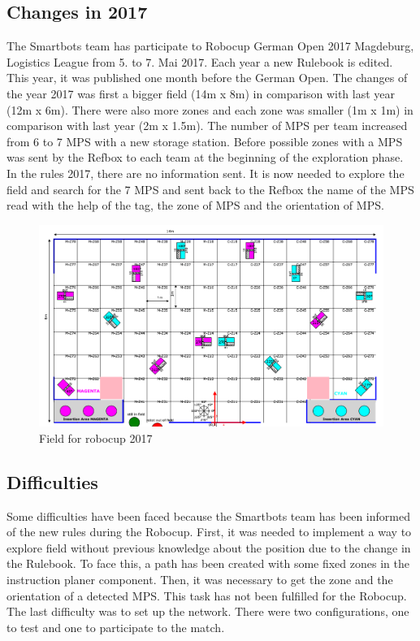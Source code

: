 \subsection{Changes in 2017}

The Smartbots team has participate to Robocup German Open 2017 Magdeburg, Logistics League from 5. to 7. Mai 2017. Each year a new Rulebook is edited. This year, it was published one month before the German Open. The changes of the year 2017 was first a bigger field (14m x 8m) in comparison with last year (12m x 6m). There were also more zones and each zone was smaller (1m x 1m) in comparison with last year (2m x 1.5m). The number of MPS per team increased from 6 to 7 MPS with a new storage station. Before possible zones with a MPS was sent by the Refbox to each team at the beginning of the exploration phase. In the rules 2017, there are no information sent. It is now needed to explore the field and search for the 7 MPS and sent back to the Refbox the name of the MPS read with the help of the tag, the zone of MPS and the orientation of MPS. 

\begin{figure}%
\centering
\includegraphics[width=\linewidth]{pic/field.png}
\caption{Field for robocup 2017}
\label{fig:frog}
\end{figure}

\subsection{Difficulties}

Some difficulties have been faced because the Smartbots team has been informed of the new rules during the Robocup. First, it was needed to implement a way to explore field without previous knowledge about the position due to the change in the Rulebook. To face this, a path has been created with some fixed zones in the instruction planer component.  Then, it was necessary to get the zone and the orientation of a detected MPS. This task has not been fulfilled for the Robocup. The last difficulty was to set up the network. There were two configurations, one to test and one to participate to the match.
 

